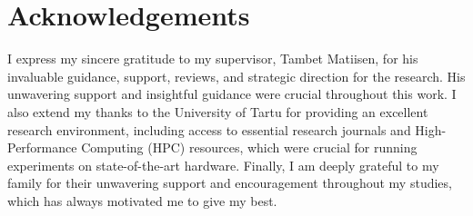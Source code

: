 \section{Acknowledgements} \label{Acknowledgements}

I express my sincere gratitude to my supervisor, Tambet Matiisen, for his invaluable guidance, support, reviews, and strategic direction for the research. His unwavering support and insightful guidance were crucial throughout this work. I also extend my thanks to the University of Tartu for providing an excellent research environment, including access to essential research journals and High-Performance Computing (HPC) resources, which were crucial for running experiments on state-of-the-art hardware. Finally, I am deeply grateful to my family for their unwavering support and encouragement throughout my studies, which has always motivated me to give my best.
